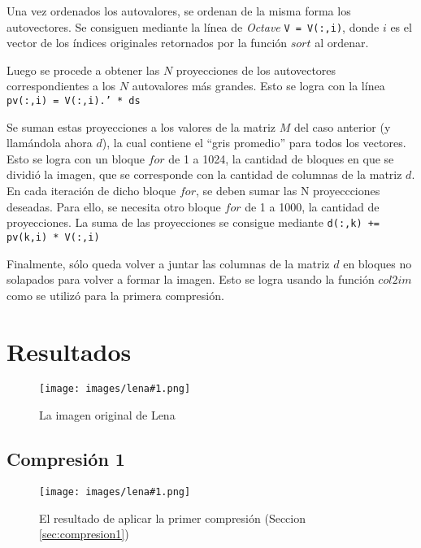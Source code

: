 \documentclass[twocolumn,a4paper,10pt]{article}
\begin{document}
Una vez ordenados los autovalores, se ordenan de la misma forma los autovectores. Se consiguen mediante la línea de \textit{Octave} \texttt{V = V(:,i)}, donde $i$ es el vector de los índices originales retornados por la función $sort$ al ordenar.

Luego se procede a obtener las $N$ proyecciones de los autovectores correspondientes a los $N$ autovalores más grandes. Esto se logra con la línea \texttt{pv(:,i) = V(:,i).' * ds}

Se suman estas proyecciones a los valores de la matriz $M$ del caso anterior (y llam\'andola ahora $d$), la cual contiene el ``gris promedio'' para todos los vectores. Esto se logra con un bloque $for$ de 1 a 1024, la cantidad de bloques en que se dividió la imagen, que se corresponde con la cantidad de columnas de la matriz $d$. En cada iteración de dicho bloque $for$, se deben sumar las N proyeccciones deseadas. Para ello, se necesita otro bloque $for$ de 1 a 1000, la cantidad de proyecciones. La suma de las proyecciones se consigue mediante \texttt{d(:,k)\: += pv(k,i) * V(:,i)}

Finalmente, s\'olo queda volver a juntar las columnas de la matriz $d$ en bloques no solapados para volver a formar la imagen. Esto se logra usando la funci\'on $col2im$ como se utilizó para la primera compresi\'on.  

\section{Resultados}
\label{sec:resultados}

\newcommand{\lena}[2]{
    \begin{figure}[H]
        \texttt{[image: images/lena\#1.png]}
        \caption{#2}
        \label{fig:lena#1}
    \end{figure}
}

\newcommand{\autoimage}[2]{
    \begin{figure}[H]
        \texttt{[image: images/autoimage\#1.png]}
        \caption{#2}
        \label{fig:lena#1}
    \end{figure}
}


\lena{512}{La imagen original de Lena}

\subsection{Compresi\'on 1}

\lena{-bruta}{El resultado de aplicar la primer compresi\'on (Seccion \ref{sec:compresion1})}
\end{document}
